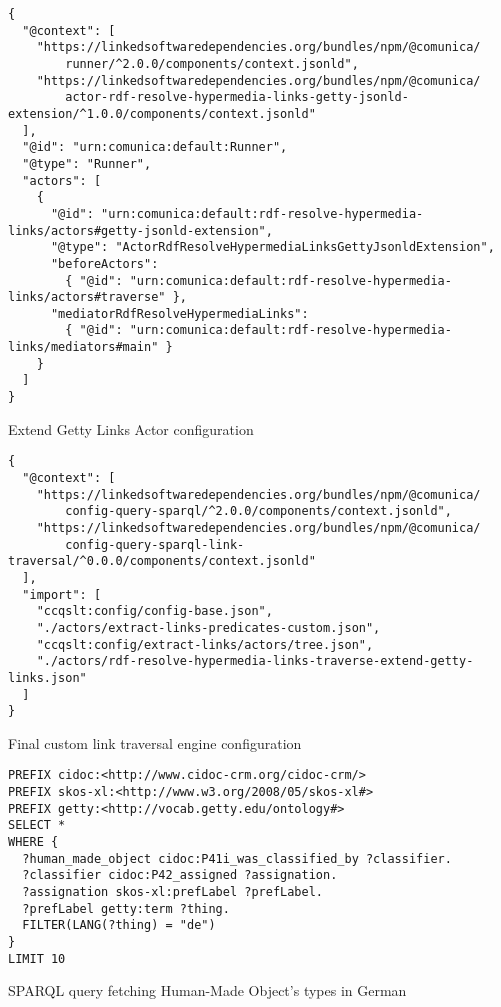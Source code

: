 \begin{listing}[htbp]
    \begin{verbatim}
{
  "@context": [
    "https://linkedsoftwaredependencies.org/bundles/npm/@comunica/
        runner/^2.0.0/components/context.jsonld",
    "https://linkedsoftwaredependencies.org/bundles/npm/@comunica/
        actor-rdf-resolve-hypermedia-links-getty-jsonld-extension/^1.0.0/components/context.jsonld"
  ],
  "@id": "urn:comunica:default:Runner",
  "@type": "Runner",
  "actors": [
    {
      "@id": "urn:comunica:default:rdf-resolve-hypermedia-links/actors#getty-jsonld-extension",
      "@type": "ActorRdfResolveHypermediaLinksGettyJsonldExtension",
      "beforeActors":
        { "@id": "urn:comunica:default:rdf-resolve-hypermedia-links/actors#traverse" },
      "mediatorRdfResolveHypermediaLinks":
        { "@id": "urn:comunica:default:rdf-resolve-hypermedia-links/mediators#main" }
    }
  ]
}
    \end{verbatim}
    \caption{Extend Getty Links Actor configuration}
    \label{lst:actor_config_getty}
\end{listing}

\begin{listing}[htbp]
    \begin{verbatim}
{
  "@context": [
    "https://linkedsoftwaredependencies.org/bundles/npm/@comunica/
        config-query-sparql/^2.0.0/components/context.jsonld",
    "https://linkedsoftwaredependencies.org/bundles/npm/@comunica/
        config-query-sparql-link-traversal/^0.0.0/components/context.jsonld"
  ],
  "import": [
    "ccqslt:config/config-base.json",
    "./actors/extract-links-predicates-custom.json",
    "ccqslt:config/extract-links/actors/tree.json",
    "./actors/rdf-resolve-hypermedia-links-traverse-extend-getty-links.json"
  ]
}
    \end{verbatim}
    \caption{Final custom link traversal engine configuration}
    \label{lst:config_final}
\end{listing}

\begin{listing}[htbp]
    \begin{verbatim}
PREFIX cidoc:<http://www.cidoc-crm.org/cidoc-crm/>
PREFIX skos-xl:<http://www.w3.org/2008/05/skos-xl#>
PREFIX getty:<http://vocab.getty.edu/ontology#>
SELECT *
WHERE {
  ?human_made_object cidoc:P41i_was_classified_by ?classifier.
  ?classifier cidoc:P42_assigned ?assignation.
  ?assignation skos-xl:prefLabel ?prefLabel.
  ?prefLabel getty:term ?thing.
  FILTER(LANG(?thing) = "de")
}
LIMIT 10
    \end{verbatim}
    \caption{SPARQL query fetching Human-Made Object's types in German}
    \label{lst:sparql_hmo_types_german}
\end{listing}

